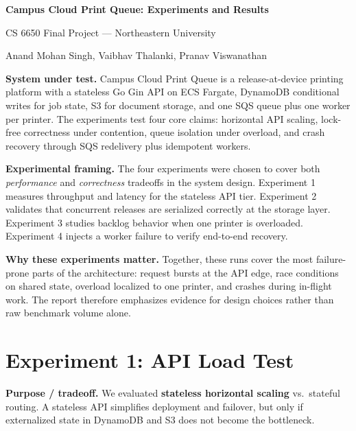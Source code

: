 \documentclass[10pt,letterpaper]{article}
\begin{document}
{\Large\bfseries Campus Cloud Print Queue: Experiments and Results\par}
{\small CS 6650 Final Project --- Northeastern University\par}
{\small Anand Mohan Singh, Vaibhav Thalanki, Pranav Viswanathan\par}

\vspace{4pt}
\begin{tcolorbox}[colback=surface,colframe=border,boxrule=0.5pt,arc=2pt,left=6pt,right=6pt,top=4pt,bottom=4pt]
\textbf{System under test.} Campus Cloud Print Queue is a release-at-device printing platform with a stateless Go Gin API on ECS Fargate, DynamoDB conditional writes for job state, S3 for document storage, and one SQS queue plus one worker per printer. The experiments test four core claims: horizontal API scaling, lock-free correctness under contention, queue isolation under overload, and crash recovery through SQS redelivery plus idempotent workers.
\end{tcolorbox}

\textbf{Experimental framing.} The four experiments were chosen to cover both \textit{performance} and \textit{correctness} tradeoffs in the system design. Experiment 1 measures throughput and latency for the stateless API tier. Experiment 2 validates that concurrent releases are serialized correctly at the storage layer. Experiment 3 studies backlog behavior when one printer is overloaded. Experiment 4 injects a worker failure to verify end-to-end recovery.

\textbf{Why these experiments matter.} Together, these runs cover the most failure-prone parts of the architecture: request bursts at the API edge, race conditions on shared state, overload localized to one printer, and crashes during in-flight work. The report therefore emphasizes evidence for design choices rather than raw benchmark volume alone.

\section*{Experiment 1: API Load Test}
\begin{claimbox}
\textbf{Purpose / tradeoff.} We evaluated \textbf{stateless horizontal scaling} vs.\ stateful routing. A stateless API simplifies deployment and failover, but only if externalized state in DynamoDB and S3 does not become the bottleneck.
\end{claimbox}
\end{document}
